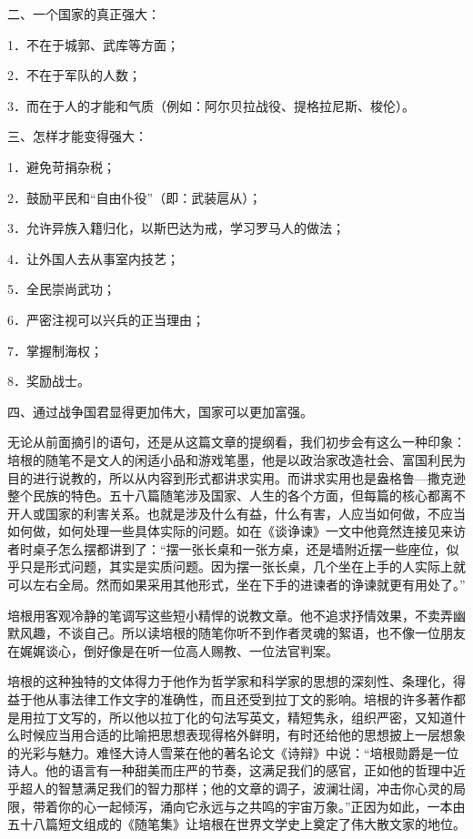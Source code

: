 \par 二、一个国家的真正强大：
\par 1．不在于城郭、武库等方面；
\par 2．不在于军队的人数；
\par 3．而在于人的才能和气质（例如：阿尔贝拉战役、提格拉尼斯、梭伦）。
\par 三、怎样才能变得强大：
\par 1．避免苛捐杂税；
\par 2．鼓励平民和“自由仆役”（即：武装扈从）；
\par 3．允许异族入籍归化，以斯巴达为戒，学习罗马人的做法；
\par 4．让外国人去从事室内技艺；
\par 5．全民崇尚武功；
\par 6．严密注视可以兴兵的正当理由；
\par 7．掌握制海权；
\par 8．奖励战士。
\par 四、通过战争国君显得更加伟大，国家可以更加富强。
\par 无论从前面摘引的语句，还是从这篇文章的提纲看，我们初步会有这么一种印象：培根的随笔不是文人的闲适小品和游戏笔墨，他是以政治家改造社会、富国利民为目的进行说教的，所以从内容到形式都讲求实用。而讲求实用也是盎格鲁—撒克逊整个民族的特色。五十八篇随笔涉及国家、人生的各个方面，但每篇的核心都离不开人或国家的利害关系。也就是涉及什么有益，什么有害，人应当如何做，不应当如何做，如何处理一些具体实际的问题。如在《谈诤谏》一文中他竟然连接见来访者时桌子怎么摆都讲到了：“摆一张长桌和一张方桌，还是墙附近摆一些座位，似乎只是形式问题，其实是实质问题。因为摆一张长桌，几个坐在上手的人实际上就可以左右全局。然而如果采用其他形式，坐在下手的进谏者的诤谏就更有用处了。”
\par 培根用客观冷静的笔调写这些短小精悍的说教文章。他不追求抒情效果，不卖弄幽默风趣，不谈自己。所以读培根的随笔你听不到作者灵魂的絮语，也不像一位朋友在娓娓谈心，倒好像是在听一位高人赐教、一位法官判案。
\par 培根的这种独特的文体得力于他作为哲学家和科学家的思想的深刻性、条理化，得益于他从事法律工作文字的准确性，而且还受到拉丁文的影响。培根的许多著作都是用拉丁文写的，所以他以拉丁化的句法写英文，精短隽永，组织严密，又知道什么时候应当用合适的比喻把思想表现得格外鲜明，有时还给他的思想披上一层想象的光彩与魅力。难怪大诗人雪莱在他的著名论文《诗辩》中说：“培根勋爵是一位诗人。他的语言有一种甜美而庄严的节奏，这满足我们的感官，正如他的哲理中近乎超人的智慧满足我们的智力那样；他的文章的调子，波澜壮阔，冲击你心灵的局限，带着你的心一起倾泻，涌向它永远与之共鸣的宇宙万象。”正因为如此，一本由五十八篇短文组成的《随笔集》让培根在世界文学史上奠定了伟大散文家的地位。
